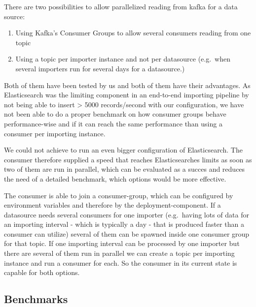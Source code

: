 There are two possibilities to allow parallelized reading from kafka for
a data source:

\begin{enumerate}
\def\labelenumi{\arabic{enumi}.}
\tightlist
\item
  Using Kafka's Consumer Groups to allow several consumers reading from
  one topic
\item
  Using a topic per importer instance and not per datasource (e.g.~when
  several importers run for several days for a datasource.)
\end{enumerate}

Both of them have been tested by us and both of them have their
advantages. As Elasticsearch was the limiting component in an end-to-end
importing pipeline by not being able to insert \textgreater{} 5000
records/second with our configuration, we have not been able to do a
proper benchmark on how consumer groups behave performance-wise and if
it can reach the same performance than using a consumer per importing
instance.

We could not achieve to run an even bigger configuration of
Elasticsearch. The consumer therefore supplied a speed that reaches
Elasticsearches limits as soon as two of them are run in parallel, which
can be evaluated as a succes and reduces the need of a detailed
benchmark, which options would be more effective.

The consumer is able to join a consumer-group, which can be configured
by environment variables and therefore by the deployment-component. If a
datasource needs several consumers for one importer (e.g.~having lots of
data for an importing interval - which is typically a day - that is
produced faster than a consumer can utilize) several of them can be
spawned inside one consumer group for that topic. If one importing
interval can be processed by one importer but there are several of them
run in parallel we can create a topic per importing instance and run a
consumer for each. So the consumer in its current state is capable for
both options.

\subsection{Benchmarks}\label{benchmarks}
